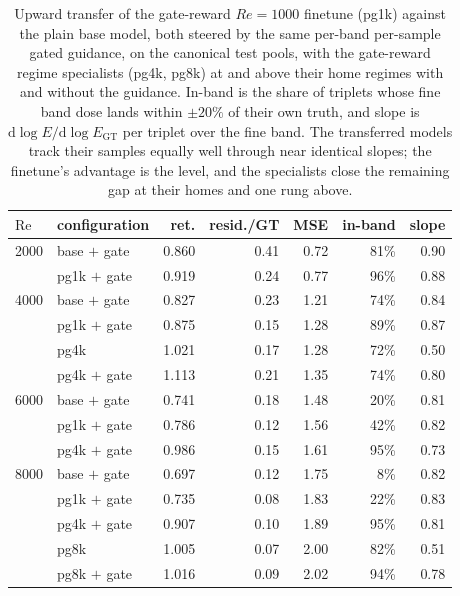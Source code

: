 \begin{table}[H]
  \centering
  \caption{Upward transfer of the gate-reward $Re{=}1000$ finetune (pg1k) against the plain base model, both steered by the same per-band per-sample gated guidance, on the canonical test pools, with the gate-reward regime specialists (pg4k, pg8k) at and above their home regimes with and without the guidance. In-band is the share of triplets whose fine band dose lands within $\pm20\%$ of their own truth, and slope is $\mathrm{d}\log E/\mathrm{d}\log E_{\mathrm{GT}}$ per triplet over the fine band. The transferred models track their samples equally well through near identical slopes; the finetune's advantage is the level, and the specialists close the remaining gap at their homes and one rung above.}
  \label{tab:pg1k-transfer-gate}
  \begin{tabular}{llrrrrr}
    \toprule
    $\mathrm{Re}$ & configuration & ret. & resid./GT & MSE & in-band & slope \\
    \midrule
    2000 & base $+$ gate & 0.860 & 0.41 & 0.72 & 81\% & 0.90 \\
         & pg1k $+$ gate & 0.919 & 0.24 & 0.77 & 96\% & 0.88 \\
    \midrule
    4000 & base $+$ gate & 0.827 & 0.23 & 1.21 & 74\% & 0.84 \\
         & pg1k $+$ gate & 0.875 & 0.15 & 1.28 & 89\% & 0.87 \\
         & pg4k & 1.021 & 0.17 & 1.28 & 72\% & 0.50 \\
         & pg4k $+$ gate & 1.113 & 0.21 & 1.35 & 74\% & 0.80 \\
    \midrule
    6000 & base $+$ gate & 0.741 & 0.18 & 1.48 & 20\% & 0.81 \\
         & pg1k $+$ gate & 0.786 & 0.12 & 1.56 & 42\% & 0.82 \\
         & pg4k $+$ gate & 0.986 & 0.15 & 1.61 & 95\% & 0.73 \\
    \midrule
    8000 & base $+$ gate & 0.697 & 0.12 & 1.75 & 8\% & 0.82 \\
         & pg1k $+$ gate & 0.735 & 0.08 & 1.83 & 22\% & 0.83 \\
         & pg4k $+$ gate & 0.907 & 0.10 & 1.89 & 95\% & 0.81 \\
         & pg8k & 1.005 & 0.07 & 2.00 & 82\% & 0.51 \\
         & pg8k $+$ gate & 1.016 & 0.09 & 2.02 & 94\% & 0.78 \\
    \bottomrule
  \end{tabular}
\end{table}
